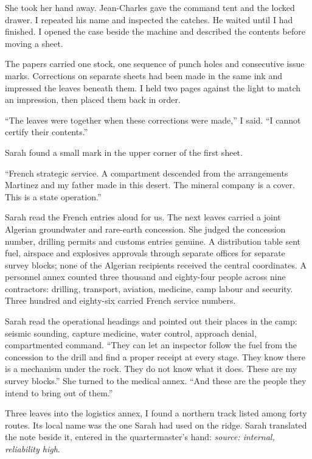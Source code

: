 She took her hand away. Jean-Charles gave the command tent and the locked drawer. I repeated his name and inspected the catches. He waited until I had finished. I opened the case beside the machine and described the contents before moving a sheet.\par

The papers carried one stock, one sequence of punch holes and consecutive issue marks. Corrections on separate sheets had been made in the same ink and impressed the leaves beneath them. I held two pages against the light to match an impression, then placed them back in order.\par

``The leaves were together when these corrections were made,'' I said. ``I cannot certify their contents.''\par

Sarah found a small mark in the upper corner of the first sheet.\par

``French strategic service. A compartment descended from the arrangements Martinez and my father made in this desert. The mineral company is a cover. This is a state operation.''\par

Sarah read the French entries aloud for us. The next leaves carried a joint Algerian groundwater and rare-earth concession. She judged the concession number, drilling permits and customs entries genuine. A distribution table sent fuel, airspace and explosives approvals through separate offices for separate survey blocks; none of the Algerian recipients received the central coordinates. A personnel annex counted three thousand and eighty-four people across nine contractors: drilling, transport, aviation, medicine, camp labour and security. Three hundred and eighty-six carried French service numbers.\par

Sarah read the operational headings and pointed out their places in the camp: seismic sounding, capture medicine, water control, approach denial, compartmented command. ``They can let an inspector follow the fuel from the concession to the drill and find a proper receipt at every stage. They know there is a mechanism under the rock. They do not know what it does. These are my survey blocks.'' She turned to the medical annex. ``And these are the people they intend to bring out of them.''\par

Three leaves into the logistics annex, I found a northern track listed among forty routes. Its local name was the one Sarah had used on the ridge. Sarah translated the note beside it, entered in the quartermaster's hand: \emph{source: internal, reliability high}.\par

